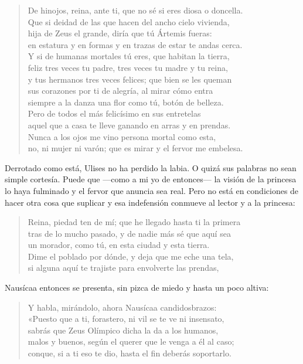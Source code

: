 \documentclass[11pt,a4paper]{article}
\begin{document}
\begin{verse}
De hinojos, reina, ante ti, que no sé si eres diosa o doncella.\\
Que si deidad de las que hacen del ancho cielo vivienda,\\
hija de Zeus el grande, diría que tú Ártemis fueras:\\
en estatura y en formas y en trazas de estar te andas cerca.\\
Y si de humanas mortales tú eres, que habitan la tierra,\\
feliz tres veces tu padre, tres veces tu madre y tu reina,\\
y tus hermanos tres veces felices; que bien se les queman\\
sus corazones por ti de alegría, al mirar cómo entra\\
siempre a la danza una flor como tú, botón de belleza.\\
Pero de todos el más felicísimo en sus entretelas\\
aquel que a casa te lleve ganando en arras y en prendas.\\
Nunca a los ojos me vino persona mortal como esta,\\
no, ni mujer ni varón; que es mirar y el fervor me embelesa.
\end{verse}

Derrotado como está, Ulises no ha perdido la labia. O quizá sus palabras no sean simple cortesía. Puede que ---como a mi yo de entonces--- la visión de la princesa lo haya fulminado y el fervor que anuncia sea real. Pero no está en condiciones de hacer otra cosa que suplicar y esa indefensión conmueve al lector y a la princesa:

\begin{verse}
Reina, piedad ten de mí; que he llegado hasta ti la primera\\
tras de lo mucho pasado, y de nadie más sé que aquí sea\\
un morador, como tú, en esta ciudad y esta tierra.\\
Dime el poblado por dónde, y deja que me eche una tela,\\
si alguna aquí te trajiste para envolverte las prendas,
\end{verse}

Nausícaa entonces se presenta, sin pizca de miedo y hasta un poco altiva:

\begin{verse}
Y habla, mirándolo, ahora Nausícaa candidosbrazos:\\
«Puesto que a ti, forastero, ni vil se te ve ni insensato,\\
sabrás que Zeus Olímpico dicha la da a los humanos,\\
malos y buenos, según el querer que le venga a él al caso;\\
conque, si a ti eso te dio, hasta el fin deberás soportarlo.
\end{verse}
\end{document}
